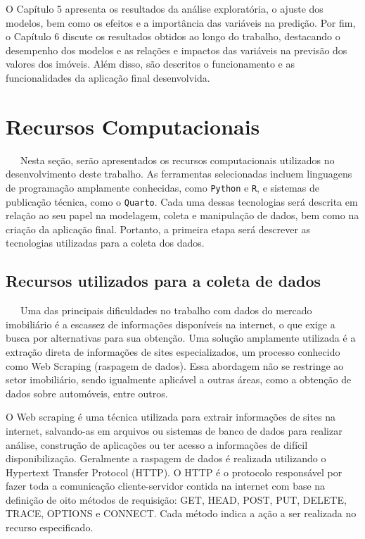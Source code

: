 \documentclass[
  12pt,
  a4paper,
]{scrreprt}
\begin{document}
\vspace{12pt}

O Capítulo 5 apresenta os resultados da análise exploratória, o ajuste
dos modelos, bem como os efeitos e a importância das variáveis na
predição. Por fim, o Capítulo 6 discute os resultados obtidos ao longo
do trabalho, destacando o desempenho dos modelos e as relações e
impactos das variáveis na previsão dos valores dos imóveis. Além disso,
são descritos o funcionamento e as funcionalidades da aplicação final
desenvolvida.

\chapter{Recursos Computacionais}\label{recursos-computacionais}

~~~Nesta seção, serão apresentados os recursos computacionais utilizados
no desenvolvimento deste trabalho. As ferramentas selecionadas incluem
linguagens de programação amplamente conhecidas, como \texttt{Python} e
\texttt{R}, e sistemas de publicação técnica, como o \texttt{Quarto}.
Cada uma dessas tecnologias será descrita em relação ao seu papel na
modelagem, coleta e manipulação de dados, bem como na criação da
aplicação final. Portanto, a primeira etapa será descrever as
tecnologias utilizadas para a coleta dos dados.

\section{Recursos utilizados para a coleta de
dados}\label{recursos-utilizados-para-a-coleta-de-dados}

~~~Uma das principais dificuldades no trabalho com dados do mercado
imobiliário é a escassez de informações disponíveis na internet, o que
exige a busca por alternativas para sua obtenção. Uma solução amplamente
utilizada é a extração direta de informações de sites especializados, um
processo conhecido como Web Scraping (raspagem de dados). Essa abordagem
não se restringe ao setor imobiliário, sendo igualmente aplicável a
outras áreas, como a obtenção de dados sobre automóveis, entre outros.

\vspace{12pt}

O Web scraping é uma técnica utilizada para extrair informações de sites
na internet, salvando-as em arquivos ou sistemas de banco de dados para
realizar análise, construção de aplicações ou ter acesso a informações
de difícil disponibilização. Geralmente a raspagem de dados é realizada
utilizando o Hypertext Transfer Protocol (HTTP). O HTTP é o protocolo
responsável por fazer toda a comunicação cliente-servidor contida na
internet com base na definição de oito métodos de requisição: GET, HEAD,
POST, PUT, DELETE, TRACE, OPTIONS e CONNECT. Cada método indica a ação a
ser realizada no recurso especificado.
\end{document}
